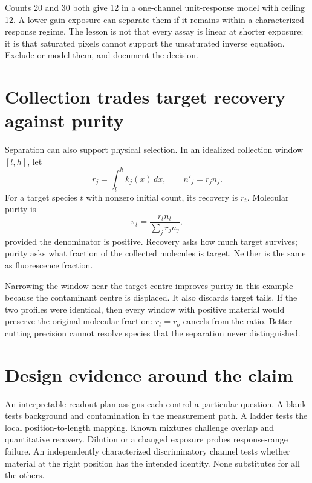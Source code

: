Counts 20 and 30 both give 12 in a one-channel unit-response model with ceiling 12. A lower-gain exposure can separate them if it remains within a characterized response regime. The lesson is not that every assay is linear at shorter exposure; it is that saturated pixels cannot support the unsaturated inverse equation. Exclude or model them, and document the decision.

\section{Collection trades target recovery against purity}
Separation can also support physical selection. In an idealized collection window $[l,h]$, let
\begin{equation}
r_j=\int_l^h k_j(x)\,dx,\qquad n'_j=r_jn_j.
\end{equation}
For a target species $t$ with nonzero initial count, its recovery is $r_t$. Molecular purity is
\begin{equation}
\pi_t=\frac{r_tn_t}{\sum_j r_jn_j},
\end{equation}
provided the denominator is positive. Recovery asks how much target survives; purity asks what fraction of the collected molecules is target. Neither is the same as fluorescence fraction.

\begin{center}\end{center}

Narrowing the window near the target centre improves purity in this example because the contaminant centre is displaced. It also discards target tails. If the two profiles were identical, then every window with positive material would preserve the original molecular fraction: $r_t=r_o$ cancels from the ratio. Better cutting precision cannot resolve species that the separation never distinguished.

\section{Design evidence around the claim}
An interpretable readout plan assigns each control a particular question. A blank tests background and contamination in the measurement path. A ladder tests the local position-to-length mapping. Known mixtures challenge overlap and quantitative recovery. Dilution or a changed exposure probes response-range failure. An independently characterized discriminatory channel tests whether material at the right position has the intended identity. None substitutes for all the others.

